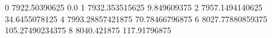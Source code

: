 0 7922.50390625 0.0
1 7932.353515625 9.849609375
2 7957.1494140625 34.6455078125
4 7993.28857421875 70.78466796875
6 8027.77880859375 105.27490234375
8 8040.421875 117.91796875
